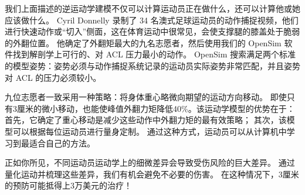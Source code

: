 我们上面描述的逆运动学建模不仅可以计算运动员正在做什么，还可以计算他或她应该做什么。
Cyril Donnelly 录制了 34 名澳式足球运动员的动作捕捉视频，他们进行快速动作或“切入”侧面，这在体育运动中很常见，会使支撑腿的膝盖处于脆弱的外翻位置\cite{donnelly2012optimizing}。
他确定了外翻矩最大的九名志愿者，然后使用我们的 OpenSim 软件找到解剖学上可行的、对 ACL 压力最小的动作。
OpenSim 搜索满足两个标准的模型姿势：姿势必须与动作捕捉系统记录的运动员实际姿势非常匹配，并且姿势对 ACL 的压力必须较小。


九位志愿者一致采用一种策略：将身体重心略微向期望的运动方向移动。
即使只有3厘米的微小移动，也能使峰值外翻力矩降低40\%。该运动学模型的优势在于：
首先，它确定了重心移动是减少这些动作中外翻力矩的最有效策略；
其次，该模型可以根据每位运动员进行量身定制。
通过这种方式，运动员可以从计算机中学习到最适合自己的方法。


正如你所见，不同运动员运动学上的细微差异会导致受伤风险的巨大差异。
通过量化运动并梳理这些差异，我们有机会避免不必要的伤害。
在这种情况下，3厘米的预防可能抵得上3万美元的治疗！












